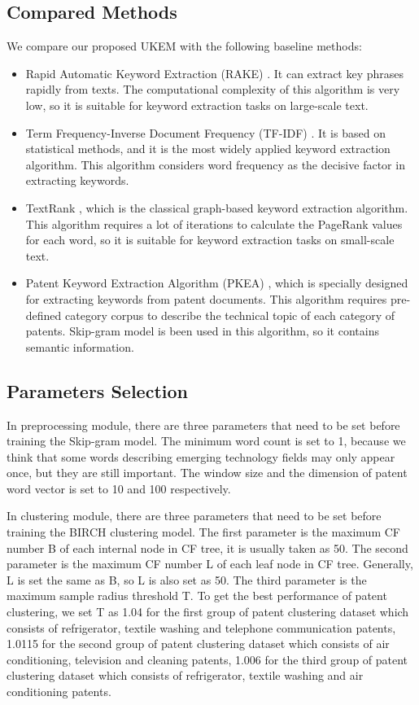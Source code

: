 \documentclass[conference]{IEEEtran}
\begin{document}
	\subsection{Compared Methods}
	We compare our proposed UKEM with the following baseline methods:
	\begin{itemize}
		\item Rapid Automatic Keyword Extraction (RAKE) \cite{b7}. It can extract key phrases rapidly from texts. The computational complexity of this algorithm is very low, so it is suitable for keyword extraction tasks on large-scale text.
		\item Term Frequency-Inverse Document Frequency (TF-IDF) \cite{b5}. It is based on statistical methods, and it is the most widely applied keyword extraction algorithm. This algorithm considers word frequency as the decisive factor in extracting keywords.
		\item TextRank \cite{b6}, which is the classical graph-based keyword extraction algorithm. This algorithm requires a lot of iterations to calculate the PageRank values for each word, so it is suitable for keyword extraction tasks on small-scale text.
		\item Patent Keyword Extraction Algorithm (PKEA) \cite{b8}, which is specially designed for extracting keywords from patent documents. This algorithm requires pre-defined category corpus to describe the technical topic of each category of patents. Skip-gram model is been used in this algorithm, so it contains semantic information.
	\end{itemize}
	\subsection{Parameters Selection}
	In preprocessing module, there are three parameters that need to be set before training the Skip-gram model. The minimum word count is set to 1, because we think that some words describing emerging technology fields may only appear once, but they are still important. The window size and the dimension of patent word vector is set to 10 and 100 respectively.
	
	In clustering module, there are three parameters that need to be set before training the BIRCH clustering model. The first parameter is the maximum CF number B of each internal node in CF tree, it is usually taken as 50. The second parameter is the maximum CF number L of each leaf node in CF tree. Generally, L is set the same as B, so L is also set as 50. The third parameter is the maximum sample radius threshold T. To get the best performance of patent clustering, we set T as 1.04 for the first group of patent clustering dataset which consists of refrigerator, textile washing and telephone communication patents, 1.0115 for the second group of patent clustering dataset which consists of air conditioning, television and cleaning patents, 1.006 for the third group of patent clustering dataset which consists of refrigerator, textile washing and air conditioning patents.
	
\end{document}
